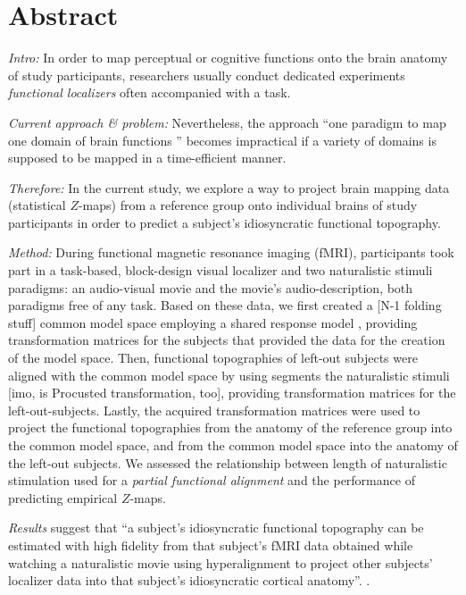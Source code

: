\section{Abstract}
\textit{Intro:} In order to map perceptual or cognitive functions onto the brain
anatomy of study participants, researchers usually conduct dedicated experiments
\textit{functional localizers} often accompanied with a task.

\textit{Current approach \& problem:} Nevertheless, the approach ``one paradigm
to map one domain of brain functions '' becomes impractical if a variety of
domains is supposed to be mapped in a time-efficient manner.

\textit{Therefore:} In the current study, we explore a way to project brain
mapping data (statistical $Z$-maps) from a reference group onto individual
brains of study participants in order to predict a subject's idiosyncratic
functional topography.

\textit{Method:}
During functional magnetic resonance imaging (fMRI), participants took part in a
task-based, block-design visual localizer and two naturalistic stimuli
paradigms: an audio-visual movie and the movie's audio-description, both
paradigms free of any task.
Based on these data, we first created a [N-1 folding stuff] common model space
employing a shared response model \citep{chen2015reduced}, providing
transformation matrices for the subjects that provided the data for the creation
of the model space.
Then, functional topographies of left-out subjects were aligned with the common
model space by using  segments the naturalistic stimuli [imo, is Procusted
transformation, too], providing transformation matrices for the
left-out-subjects.
Lastly, the acquired transformation matrices were used to project the functional
topographies from the anatomy of the reference group into the common model
space, and from the common model space into the anatomy of the left-out
subjects.
We assessed the relationship between length of naturalistic stimulation used for
a \textit{partial functional alignment} and the performance of predicting
empirical $Z$-maps.

%
\textit{Results} suggest that ``a subject's idiosyncratic functional topography
can be estimated with high fidelity from that subject's fMRI data obtained while
watching a naturalistic movie using hyperalignment to project other subjects’
localizer data into that subject's idiosyncratic cortical anatomy''.
\citep{jiahui2020predicting}.

